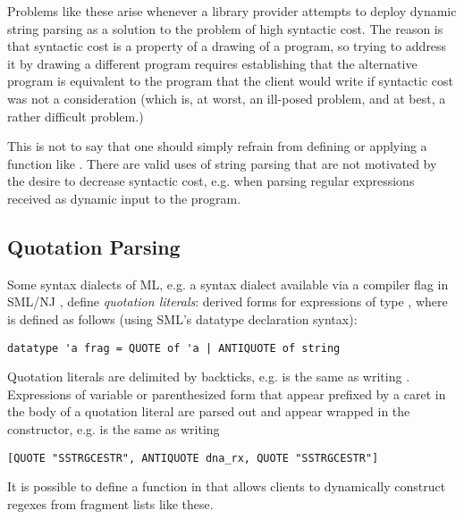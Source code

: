 \begin{enumerate}

\end{enumerate}

Problems like these arise whenever a library provider attempts to deploy dynamic string parsing as a solution to the problem of high syntactic cost. The reason is that syntactic cost is a property of a drawing of a program, so trying to address it by drawing a different program requires establishing that the alternative program is equivalent to the program that the client would write if syntactic cost was not a consideration (which is, at worst, an ill-posed problem, and at best, a rather difficult problem.) %

This is not to say that one should simply refrain from defining or applying a function like . There are  valid uses of string parsing that are not motivated by the desire to decrease syntactic cost, e.g. when parsing regular expressions received as dynamic input to the program.%

\subsection{Quotation Parsing}\label{sec:dynamic-quotation}
Some syntax dialects of ML, e.g. a syntax dialect available via a compiler flag in SML/NJ \cite{SML/Quote}, define \emph{quotation literals}:  derived forms for expressions of type , where  is defined as follows (using SML's datatype declaration syntax):
\begin{lstlisting}[numbers=none]
datatype 'a frag = QUOTE of 'a | ANTIQUOTE of string
\end{lstlisting}
Quotation literals are delimited by backticks, e.g.  is the same as writing . Expressions of variable or parenthesized form that appear prefixed by a caret in the body of a quotation literal  are parsed out and appear wrapped in the  constructor, e.g.   is the same as writing 
\begin{lstlisting}[numbers=none]
[QUOTE "SSTRGCESTR", ANTIQUOTE dna_rx, QUOTE "SSTRGCESTR"]
\end{lstlisting}
It is possible to define a function  in  that allows clients to dynamically construct regexes from  fragment lists like these.

